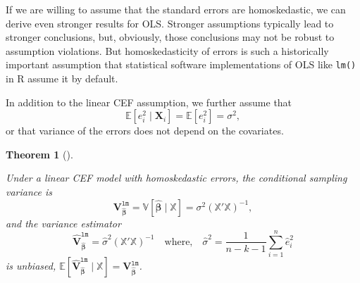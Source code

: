\documentclass[
  13pt,
  letterpaper,
  DIV=11,
  numbers=noendperiod]{scrreprt}
\newcommand{\mb}{\symbf}
\newcommand{\E}{\mathbb{E}}
\newcommand{\V}{\mathbb{V}}
\newcommand{\X}{\mb{X}}
\newcommand{\Xmat}{\mathbb{X}}
\newcommand{\bhat}{\widehat{\mb{\beta}}}
\theoremstyle{definition}
\theoremstyle{definition}
\theoremstyle{plain}
\newtheorem{theorem}{Theorem}[chapter]
\theoremstyle{remark}
\begin{document}
If we are willing to assume that the standard errors are homoskedastic,
we can derive even stronger results for OLS. Stronger assumptions
typically lead to stronger conclusions, but, obviously, those
conclusions may not be robust to assumption violations. But
homoskedasticity of errors is such a historically important assumption
that statistical software implementations of OLS like \texttt{lm()} in R
assume it by default.

\begin{tcolorbox}[enhanced jigsaw, leftrule=.75mm, colbacktitle=quarto-callout-note-color!10!white, title=\textcolor{quarto-callout-note-color}{\faInfo}\hspace{0.5em}{Assumption: Homoskedasticity with a linear CEF}, toptitle=1mm, breakable, left=2mm, toprule=.15mm, arc=.35mm, opacitybacktitle=0.6, opacityback=0, colback=white, rightrule=.15mm, titlerule=0mm, colframe=quarto-callout-note-color-frame, bottomtitle=1mm, bottomrule=.15mm, coltitle=black]

In addition to the linear CEF assumption, we further assume that \[
\E[e_i^2 \mid \X_i] = \E[e_i^2] = \sigma^2,
\] or that variance of the errors does not depend on the covariates.

\end{tcolorbox}

\begin{theorem}[]\protect\hypertarget{thm-homoskedasticity}{}\label{thm-homoskedasticity}

Under a linear CEF model with homoskedastic errors, the conditional
sampling variance is \[
\mb{V}^{\texttt{lm}}_{\bhat} = \V[\bhat \mid \Xmat] = \sigma^2 \left( \Xmat'\Xmat \right)^{-1},
\] and the variance estimator \[
\widehat{\mb{V}}^{\texttt{lm}}_{\bhat} = \widehat{\sigma}^2 \left( \Xmat'\Xmat \right)^{-1} \quad\text{where,}\quad \widehat{\sigma}^2 = \frac{1}{n - k - 1} \sum_{i=1}^n \widehat{e}_i^2
\] is unbiased,
\(\E[\widehat{\mb{V}}^{\texttt{lm}}_{\bhat} \mid \Xmat] = \mb{V}^{\texttt{lm}}_{\bhat}\).

\end{theorem}
\end{document}

